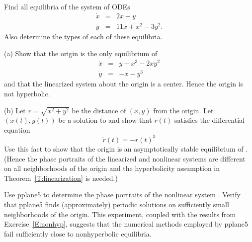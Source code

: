 \documentclass{ximera}
\begin{document}
\begin{exercise} \label{c8.2.8}
Find all equilibria of the system of ODEs
\begin{eqnarray*}
\dot{x} & = & 2x - y \\
\dot{y} & = & 11x + x^2 - 3y^2.
\end{eqnarray*}
Also determine the types of each of these equilibria.
\end{exercise}

\begin{exercise}  \label{E:nonhyp}
\noindent (a)  Show that the origin is the only equilibrium of 
\begin{equation*}  \label{e:nonhypcenter}
\begin{array}{rcl}
\dot{x} & = & y -x^3 -2xy^2 \\
\dot{y} & = & -x - y^3
\end{array}
\end{equation*}
and that the linearized system about the origin is a 
center. Hence the origin is not hyperbolic.

\noindent (b)  Let $r=\sqrt{x^2+y^2}$ be the distance of $(x,y)$ from the 
origin.  Let $(x(t),y(t))$ be a solution to  and show 
that $r(t)$ satisfies the differential equation
\[
\dot{r}(t) = -r(t)^3
\]
Use this fact to show that the origin is an asymptotically stable equilibrium
of .  (Hence the phase portraits of the linearized and 
nonlinear systems are different on all neighborhoods of the origin and  
the hyperbolicity assumption in Theorem~\ref{T:linearization} is needed.)
\end{exercise}

\CEXER

\begin{exercise} \label{c8.2.10}
Use {\sf pplane5} to determine the phase portraits of the nonlinear system
.  Verify that {\sf pplane5} finds (approximately) 
periodic solutions on sufficiently small neighborhoods of the origin.  This 
experiment, coupled with the results from Exercise~\ref{E:nonhyp}, suggests 
that the numerical methods employed by {\sf pplane5} fail sufficiently close 
to nonhyperbolic equilibria.
\end{exercise}
\end{document}

